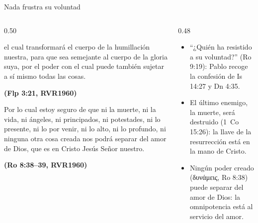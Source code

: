 \documentclass[hyperref={bookmarks=false},aspectratio=169]{beamer}
\newcommand{\grc}[1]{\foreignlanguage{ancientgreek}{#1}}
\newcommand{\fuente}[1]{\par\hfill{\upshape\bfseries\footnotesize\textcolor{azul}{#1}}}
\begin{document}
\begin{frame}{Nada frustra su voluntad}
\begin{columns}[t,onlytextwidth]
\begin{column}{0.50\textwidth}
\begin{cita}[fontupper=\scriptsize\itshape]el cual transformará el cuerpo de la humillación nuestra, para que sea semejante al cuerpo de la gloria suya, por el poder con el cual puede también sujetar a sí mismo todas las cosas.\fuente{(Flp 3:21, RVR1960)}\end{cita}
\begin{cita}[fontupper=\scriptsize\itshape]Por lo cual estoy seguro de que ni la muerte, ni la vida, ni ángeles, ni principados, ni potestades, ni lo presente, ni lo por venir, ni lo alto, ni lo profundo, ni ninguna otra cosa creada nos podrá separar del amor de Dios, que es en Cristo Jesús Señor nuestro.\fuente{(Ro 8:38--39, RVR1960)}\end{cita}
\end{column}
\begin{column}{0.48\textwidth}\small
\begin{itemize}
\item ``¿Quién ha resistido a su voluntad?'' (Ro 9:19): Pablo recoge la confesión de Is 14:27 y Dn 4:35.
\item El último enemigo, la muerte, será destruido (1~Co 15:26): la llave de la resurrección está en la mano de Cristo.
\item Ningún poder creado (\grc{δυνάμεις}, Ro 8:38) puede separar del amor de Dios: la omnipotencia está al servicio del amor.
\end{itemize}
\end{column}
\end{columns}
\end{frame}
\end{document}

